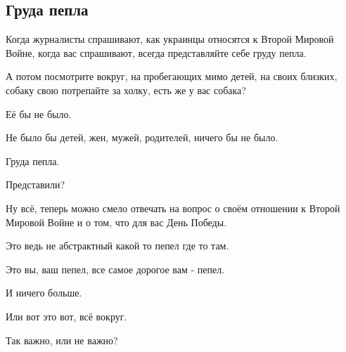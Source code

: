  
 
 
 
 
\subsection{Груда пепла}

Когда журналисты спрашивают, как украинцы относятся к Второй Мировой Войне,
когда вас спрашивают, всегда представляйте себе груду пепла.

А потом посмотрите вокруг, на пробегающих мимо детей, на своих близких, собаку
свою потрепайте за холку, есть же у вас собака?

Её бы не было.

Не было бы детей, жен, мужей, родителей, ничего бы не было.

Груда пепла.

Представили?

Ну всё, теперь можно смело отвечать на вопрос о своём отношении к Второй
Мировой Войне и о том, что для вас День Победы.

Это ведь не абстрактный какой то пепел где то там.

Это вы, ваш пепел, все самое дорогое вам - пепел.

И ничего больше.

Или вот это вот, всё вокруг.

Так важно, или не важно?
